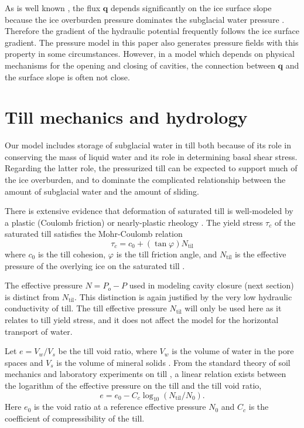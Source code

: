 \documentclass[gmd]{copernicus}   %
\newcommand{\text}{\textrm}
\newcommand\bq{\mathbf{q}}
\begin{document}
As is well known \citep{Clarke05}, the flux $\bq$ depends significantly on the ice surface slope because the ice overburden pressure dominates the subglacial water pressure \citep{Shreve1972}.  Therefore the gradient of the hydraulic potential frequently follows the ice surface gradient.  The pressure model in this paper also generates pressure fields with this property in some circumstances.  However, in a model which depends on physical mechanisms for the opening and closing of cavities, the connection between $\bq$ and the surface slope is often not close.


\section{Till mechanics and hydrology} \label{sec:tillmechanics}

Our model includes storage of subglacial water in till both because of its role in conserving the mass of liquid water and its role in determining basal shear stress.  Regarding the latter role, the pressurized till can be expected to support much of the ice overburden, and to dominate the complicated relationship between the amount of subglacial water and the amount of sliding.

There is extensive evidence that deformation of saturated till is well-modeled by a plastic (Coulomb friction) or nearly-plastic rheology \citep{Hookeetal1997,TrufferHarrisonEchelmeyer2000,Tulaczyketal2000,SchoofTill}.  The yield stress $\tau_c$ of the saturated till satisfies the Mohr-Coulomb relation
\newcommand{\Ntil}{N_{\text{til}}}
\begin{equation}
\tau_c = c_0 + (\tan \varphi) \Ntil  \label{eq:mohrcoulomb}
\end{equation}
where $c_0$ is the till cohesion, $\varphi$ is the till friction angle, and $\Ntil$ is the effective pressure of the overlying ice on the saturated till \citep{CuffeyPaterson}.

The effective pressure $N=P_o-P$ used in modeling cavity closure (next section) is distinct from $\Ntil$.  This distinction is again justified by the very low hydraulic conductivity of till.  The till effective pressure $\Ntil$ will only be used here as it relates to till yield stress, and it does not affect the model for the horizontal transport of water.

Let $e = V_w / V_s$ be the till void ratio, where $V_w$ is the volume of water in the pore spaces and $V_s$ is the volume of mineral solids \citep{Tulaczyketal2000}.  From the standard theory of soil mechanics and laboratory experiments on till \citep{Hookeetal1997,Tulaczyketal2000}, a linear relation exists between the logarithm of the effective pressure on the till and the till void ratio,
\begin{equation}
e = e_0 - C_c \log_{10}\left(\Ntil / N_0\right).  \label{eq:voidpressure}
\end{equation}
Here $e_0$ is the void ratio at a reference effective pressure $N_0$ and $C_c$ is the coefficient of compressibility of the till.
\end{document}
